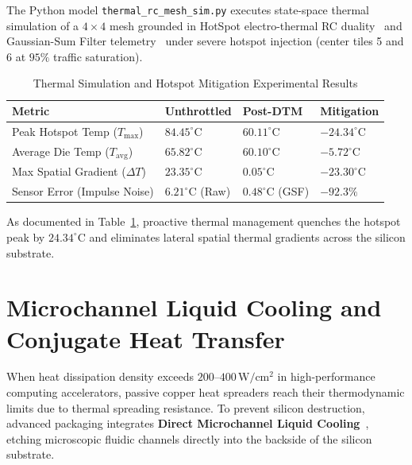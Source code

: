 The Python model \texttt{thermal\_rc\_mesh\_sim.py} executes state-space thermal simulation of a $4 \times 4$ mesh grounded in HotSpot electro-thermal RC duality~\cite{Huang2006,Skadron2003} and Gaussian-Sum Filter telemetry~\cite{Fu2019,Fu2017} under severe hotspot injection (center tiles 5 and 6 at $95\%$ traffic saturation).

\begin{table}[htbp]
\centering
\caption{Thermal Simulation and Hotspot Mitigation Experimental Results}
\label{tab:thermal-results}
\begin{tabular}{p{4.2cm}p{2.2cm}p{2.2cm}p{2.2cm}}
\hline
\textbf{Metric} & \textbf{Unthrottled} & \textbf{Post-DTM} & \textbf{Mitigation} \\
\hline
Peak Hotspot Temp ($T_{\mathrm{max}}$) & $84.45^\circ\mathrm{C}$ & $60.11^\circ\mathrm{C}$ & $\mathbf{-24.34^\circ\mathrm{C}}$ \\
Average Die Temp ($T_{\mathrm{avg}}$) & $65.82^\circ\mathrm{C}$ & $60.10^\circ\mathrm{C}$ & $\mathbf{-5.72^\circ\mathrm{C}}$ \\
Max Spatial Gradient ($\Delta T$) & $23.35^\circ\mathrm{C}$ & $0.05^\circ\mathrm{C}$ & $\mathbf{-23.30^\circ\mathrm{C}}$ \\
Sensor Error (Impulse Noise) & $6.21^\circ\mathrm{C}$ (Raw) & $0.48^\circ\mathrm{C}$ (GSF) & $\mathbf{-92.3\%}$ \\
\hline
\end{tabular}
\end{table}

As documented in Table~\ref{tab:thermal-results}, proactive thermal management quenches the hotspot peak by $24.34^\circ\mathrm{C}$ and eliminates lateral spatial thermal gradients across the silicon substrate.

\section{Microchannel Liquid Cooling and Conjugate Heat Transfer}
\label{sec:ch7_liquid_cooling}

When heat dissipation density exceeds $200\text{--}400\,\mathrm{W/cm^2}$ in high-performance computing accelerators, passive copper heat spreaders reach their thermodynamic limits due to thermal spreading resistance. To prevent silicon destruction, advanced packaging integrates \textbf{Direct Microchannel Liquid Cooling}~\cite{Tuckerman1981}, etching microscopic fluidic channels directly into the backside of the silicon substrate.

